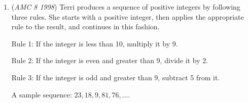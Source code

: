 \begin{enumerate}
 



\textbf{Solution 3}

Each small cube would have dimensions $1\times 1\times 1$ making each cube a unit cube.

 If there are $16$ cubes per face and there are $5$ faces we are counting, we have $16\times 5= 80$ cubes.

 Some cubes are on account of overlap between different faces.

 We could reduce this number by subtracting the overlap areas, which could mean subtracting 4 cubes from each side and 12 from the bottom.

 $80-(4\times 4+12)=80-28=52=\boxed{B}$




\textbf{Solution 4}

We can use casework to solve this.

 Case $1$: The cubes on the sides

 There are four sides of a cube which means $64$ cubes, but there will be an overlap of $16$ cubes ($4$ sides $\times$ $4$ cubes on each side).So there are $16 \times 4-16=64-16=48$ cubes on the sides.

 Case $2$: The cubes on the bottom

 There are $16$ cubes on the bottom, but by counting the cubes on the sides, $12$ of the cubes are already accounted for. $16-12=4$ cubes on the bottom that aren't already counted. 

 $48+4=\boxed{\textbf{(B)} 52}$ cubes touching at least one side. Since there is no top, we don't need to count the top face cubes.

 


	\item (\textit{AMC 8 1998}) Terri produces a sequence of positive integers by following three rules.  She starts with a positive integer, then applies the appropriate rule to the result, and continues in this fashion.  


 



 Rule 1: If the integer is less than 10, multiply it by 9.


 Rule 2: If the integer is even and greater than 9, divide it by 2.


 Rule 3: If the integer is odd and greater than 9, subtract 5 from it.


 



 A sample sequence: $23, 18, 9, 81, 76, \ldots .$



\end{enumerate}
